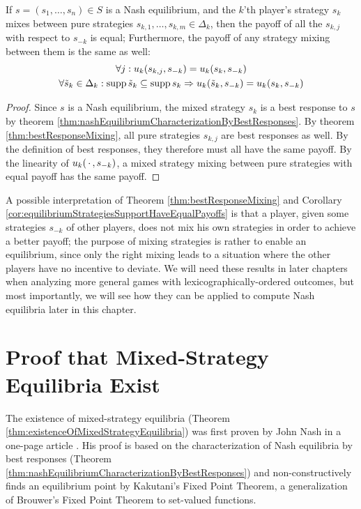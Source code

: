 \documentclass[a4paper]{scrreprt}
\begin{document}
    \begin{cor}
        \label{cor:equilibriumStrategiesSupportHaveEqualPayoffs}
        If $s = (s_1, \dots, s_n) \in S$ is a Nash equilibrium, and the $k$'th player's strategy $s_k$
        mixes between pure strategies $s_{k,1}, \dots, s_{k,m} \in \Delta_k$, then the payoff of all the $s_{k,j}$ with respect to $s_{-k}$ is equal;
        Furthermore, the payoff of any strategy mixing between them is the same as well:
        \begin{gather}
            \forall j: u_k(s_{k,j}, s_{-k}) = u_k(s_k, s_{-k}) \\
            \forall \tilde{s}_k \in \Delta_k: \operatorname{supp} \tilde{s}_k \subseteq \operatorname{supp} s_k \Rightarrow u_k(\tilde{s}_k, s_{-k}) = u_k(s_k, s_{-k})
        \end{gather}
    \end{cor}
    \begin{proof}
        Since $s$ is a Nash equilibrium, the mixed strategy $s_k$ is a best response to $s$ by theorem \ref{thm:nashEquilibriumCharacterizationByBestResponses}.
        By theorem \ref{thm:bestResponseMixing}, all pure strategies $s_{k, j}$ are best responses as well.
        By the definition of best responses, they therefore must all have the same payoff.
        By the linearity of $u_k(\,\cdot\,, s_{-k})$, a mixed strategy mixing between pure strategies with equal payoff has the same payoff.
    \end{proof}
    
    A possible interpretation of Theorem \ref{thm:bestResponseMixing} and Corollary \ref{cor:equilibriumStrategiesSupportHaveEqualPayoffs} is that a player, given some strategies $s_{-k}$ of other players, does not mix his own strategies in order to achieve a better payoff; the purpose of mixing strategies is rather to enable an equilibrium, since only the right mixing leads to a situation where the other players have no incentive to deviate.
    We will need these results in later chapters when analyzing more general games with lexicographically-ordered outcomes, but most importantly, we will see how they can be applied to compute Nash equilibria later in this chapter.
    
    \section{Proof that Mixed-Strategy Equilibria Exist}
    \label{sec:existenceOfMixedStrategyEquilibria}
    The existence of mixed-strategy equilibria (Theorem \ref{thm:existenceOfMixedStrategyEquilibria}) was first proven by John Nash in a one-page article \cite{bib:nashOnePageProofOfEquilibria}.
    His proof is based on the characterization of Nash equilibria by best responses (Theorem \ref{thm:nashEquilibriumCharacterizationByBestResponses}) and non-constructively finds an equilibrium point by Kakutani's Fixed Point Theorem, a generalization of Brouwer's Fixed Point Theorem to set-valued functions.
    
\end{document}
